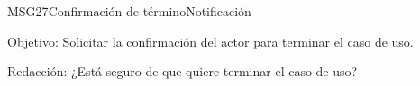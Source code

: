 \begin{mensaje}{MSG27}{Confirmación  de término}{Notificación}
	\item [Objetivo:] Solicitar la confirmación del actor para terminar el caso de uso.
	\item[Redacción:] ¿Está seguro de que quiere terminar el caso de uso?
\end{mensaje}